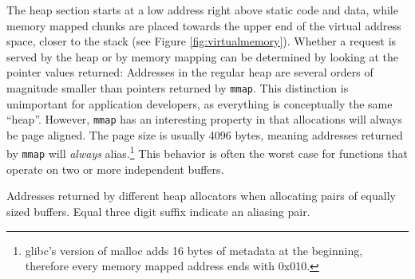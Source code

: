 \documentclass[10pt, conference, compsocconf]{IEEEtran}
\begin{document}
The heap section starts at a low address right above static code and data, while memory mapped chunks are placed towards the upper end of the virtual address space, closer to the stack (see Figure \ref{fig:virtualmemory}).
Whether a request is served by the heap or by memory mapping can be determined by looking at the pointer values returned:
Addresses in the regular heap are several orders of magnitude smaller than pointers returned by \texttt{mmap}.
This distinction is unimportant for application developers, as everything is conceptually the same ``heap''.
However, \texttt{mmap} has an interesting property in that allocations will always be page aligned.
The page size is usually 4096 bytes, meaning addresses returned by \texttt{mmap} will \emph{always} alias.\footnote{glibc's version of malloc adds 16 bytes of metadata at the beginning, therefore every memory mapped address ends with 0x010.}
This behavior is often the worst case for functions that operate on two or more independent buffers.

\begin{table}[t]
  \centering
  \caption{Addresses returned by different heap allocators when allocating pairs of equally sized buffers. Equal three digit suffix indicate an aliasing pair.\label{tab:mallocompare}}
\end{table}
\end{document}
